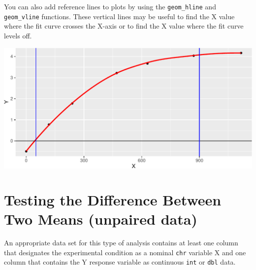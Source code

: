 \documentclass[twoside, 12pt]{article}
\newenvironment{Shaded}{\begin{snugshade}}{\end{snugshade}}
\newcommand{\KeywordTok}[1]{\textcolor[rgb]{0.13,0.29,0.53}{\textbf{{#1}}}}
\newcommand{\DataTypeTok}[1]{\textcolor[rgb]{0.13,0.29,0.53}{{#1}}}
\newcommand{\DecValTok}[1]{\textcolor[rgb]{0.00,0.00,0.81}{{#1}}}
\newcommand{\StringTok}[1]{\textcolor[rgb]{0.31,0.60,0.02}{{#1}}}
\newcommand{\OtherTok}[1]{\textcolor[rgb]{0.56,0.35,0.01}{{#1}}}
\newcommand{\NormalTok}[1]{{#1}}
\begin{document}
You can also add reference lines to plots by using the
\texttt{geom\_hline} and \texttt{geom\_vline} functions. These vertical
lines may be useful to find the X value where the fit curve crosses the
X-axis or to find the X value where the fit curve levels off.

\begin{Shaded}
\end{Shaded}

\includegraphics{skeleton_files/figure-latex/unnamed-chunk-53-1.pdf}

\section{\texorpdfstring{Testing the Difference Between \textbf{Two}
Means (unpaired
data)}{Testing the Difference Between Two Means (unpaired data)}}\label{testing-the-difference-between-two-means-unpaired-data}

An appropriate data set for this type of analysis contains at least one
column that designates the experimental condition as a nominal
\texttt{chr} variable X and one column that contains the Y response
variable as continuous \texttt{int} or \texttt{dbl} data.
\end{document}

